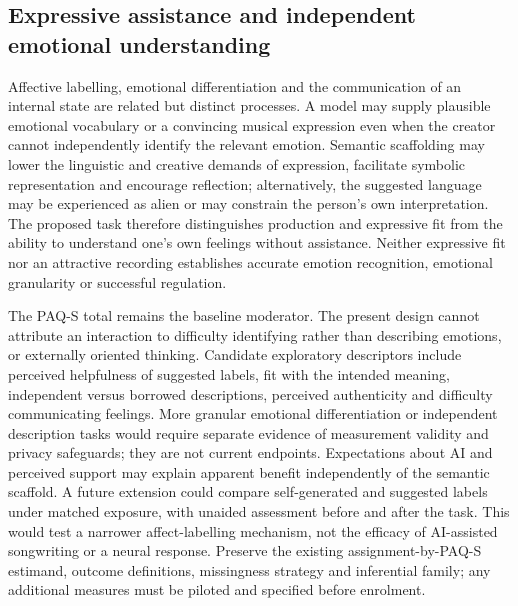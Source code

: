 \documentclass[11pt,a4paper]{article}
\begin{document}
\subsection{Expressive assistance and independent emotional understanding}
Affective labelling, emotional differentiation and the communication of an internal state are related but distinct processes. A model may supply plausible emotional vocabulary or a convincing musical expression even when the creator cannot independently identify the relevant emotion. Semantic scaffolding may lower the linguistic and creative demands of expression, facilitate symbolic representation and encourage reflection; alternatively, the suggested language may be experienced as alien or may constrain the person's own interpretation. The proposed task therefore distinguishes production and expressive fit from the ability to understand one's own feelings without assistance. Neither expressive fit nor an attractive recording establishes accurate emotion recognition, emotional granularity or successful regulation.

The PAQ-S total remains the baseline moderator. The present design cannot attribute an interaction to difficulty identifying rather than describing emotions, or externally oriented thinking. Candidate exploratory descriptors include perceived helpfulness of suggested labels, fit with the intended meaning, independent versus borrowed descriptions, perceived authenticity and difficulty communicating feelings. More granular emotional differentiation or independent description tasks would require separate evidence of measurement validity and privacy safeguards; they are not current endpoints. Expectations about AI and perceived support may explain apparent benefit independently of the semantic scaffold. A future extension could compare self-generated and suggested labels under matched exposure, with unaided assessment before and after the task. This would test a narrower affect-labelling mechanism, not the efficacy of AI-assisted songwriting or a neural response. Preserve the existing assignment-by-PAQ-S estimand, outcome definitions, missingness strategy and inferential family; any additional measures must be piloted and specified before enrolment.
\end{document}
